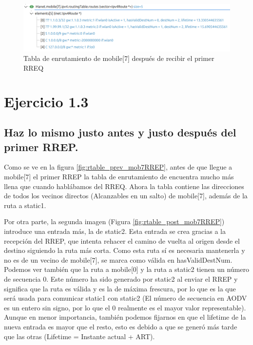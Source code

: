 \begin{figure}[H]
    \centering
    \includegraphics[width=125mm, scale=0.75]{imaxes/ejercicio2_2.png}
    \caption{Tabla de enrutamiento de mobile[7] después de recibir el primer RREQ}
    \label{fig:rtable_post_mob7}
\end{figure}

\vspace{1.25cm}
\section{Ejercicio 1.3}

\subsection{Haz lo mismo justo antes y justo después del primer RREP.}

Como se ve en la figura \ref{fig:rtable_prev_mob7RREP}, antes de que llegue a mobile[7] el primer RREP la tabla de enrutamiento de encuentra mucho más llena que cuando hablábamos del RREQ. Ahora la tabla contiene las direcciones de todos los vecinos directos (Alcanzables en un salto) de mobile[7], además de la ruta a static1.

Por otra parte, la segunda imagen (Figura \ref{fig:rtable_post_mob7RREP}) introduce una entrada más, la de static2. Esta entrada se crea gracias a la recepción del RREP, que intenta rehacer el camino de vuelta al origen desde el destino siguiendo la ruta más corta. Como esta ruta sí es necesaria mantenerla y no es de un vecino de mobile[7], se marca como válida en hasValidDestNum. Podemos ver también que la ruta a mobile[0] y la ruta a static2 tienen un número de secuencia 0. Este número ha sido generado por static2 al enviar el RREP y significa que la ruta es válida y es la de máxima frescura, por lo que es la que será usada para comunicar static1 con static2 (El número de secuencia en AODV es un entero sin signo, por lo que el 0 realmente es el mayor valor representable). Aunque en menor importancia, también podemos fijarnos en que el lifetime de la nueva entrada es mayor que el resto, esto es debido a que se generó más tarde que las otras (Lifetime = Instante actual + ART).

